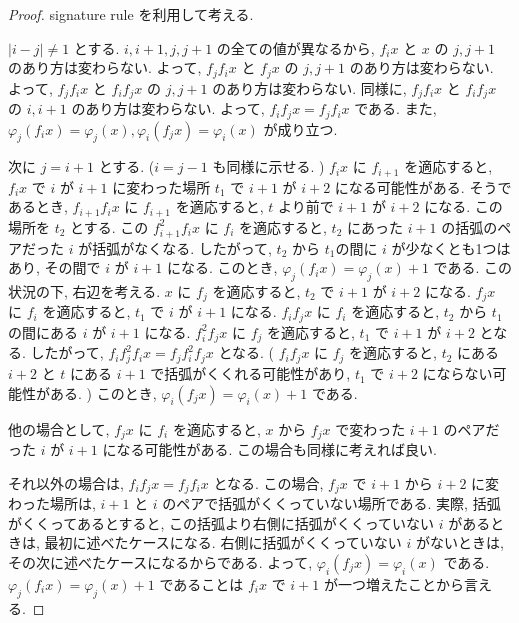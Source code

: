 \documentclass[
  a4paper, 
  12pt,
  ja=standard,
  xelatex,
  left=30truemm,
  right=30truemm,
  titlepage 
]{bxjsarticle}
\theoremstyle{definition}
\begin{document}
\begin{proof}
  signature rule を利用して考える.

  $| i - j | \neq 1$ とする.
  $i, i + 1, j, j + 1$ の全ての値が異なるから,
  $f_i x$ と $x$ の $j, j + 1$ のあり方は変わらない. よって,
  $f_jf_i x$ と $f_jx$ の $j, j + 1$ のあり方は変わらない. よって,
  $f_jf_i x$ と $f_if_jx$ の $j, j + 1$ のあり方は変わらない.
  同様に, $f_jf_i x$ と $f_if_jx$ の $i, i + 1$ のあり方は変わらない.
  よって, $f_if_j x = f_jf_i x$ である.
  また, $\varphi_j(f_ix) = \varphi_j(x), \varphi_i(f_jx) = \varphi_i(x)$
  が成り立つ.

  次に $j = i + 1$ とする. ($i = j - 1$ も同様に示せる. )
  $f_ix$ に $f_{i + 1}$ を適応すると, $f_ix$ で $i$ が $i + 1$ に変わった場所 $t_1$ で $i + 1$ が $i + 2$ になる可能性がある.
  そうであるとき, $f_{i + 1}f_ix$ に  $f_{i + 1}$ を適応すると, $t$ より前で $i + 1$ が $i + 2$ になる. この場所を
  $t_2$ とする. この $f_{i + 1}^2f_ix$ に $f_i$ を適応すると,
  $t_2$ にあった $i + 1$ の括弧のペアだった $i$ が括弧がなくなる. 
  したがって, $t_2$ から $t_1$の間に $i$ が少なくとも1つはあり, その間で $i$ が $i + 1$ になる.
  このとき, $\varphi_j(f_{i}x) = \varphi_j(x) + 1$ である.
  この状況の下, 右辺を考える.
  $x$ に $f_j$ を適応すると, $t_2$ で $i + 1$ が $i + 2$ になる.
  $f_jx$ に $f_i$ を適応すると, $t_1$ で $i$ が $i + 1$ になる.
  $f_if_jx$ に $f_i$ を適応すると, $t_2$ から $t_1$の間にある $i$ が $i + 1$ になる.
  $f_i^2f_jx$ に $f_j$ を適応すると, $t_1$ で $i + 1$ が $i + 2$ となる.
  したがって, $f_if_j^2f_i x = f_jf_i^2f_j x$ となる.
  ( $f_if_jx$ に $f_j$ を適応すると, $t_2$ にある $i + 2$ と $t$ にある $i +1$ で括弧がくくれる可能性があり,
  $t_1$ で $i + 2$ にならない可能性がある. )
  このとき, $\varphi_i(f_{j}x) = \varphi_i(x) + 1$ である.

  他の場合として, $f_jx$ に $f_i$ を適応すると, $x$ から $f_jx$ で変わった $i + 1$ のペアだった $i$ が $i + 1$
  になる可能性がある. この場合も同様に考えれば良い.

  それ以外の場合は, $f_if_j x = f_jf_i x$ となる.
  この場合, $f_{j}x$ で $i + 1$ から $i + 2$ に変わった場所は, $i + 1$ と $i$ のペアで括弧がくくっていない場所である.
  実際, 括弧がくくってあるとすると, この括弧より右側に括弧がくくっていない $i$ があるときは, 最初に述べたケースになる.
  右側に括弧がくくっていない $i$ がないときは, その次に述べたケースになるからである.
  よって, $\varphi_i(f_jx) = \varphi_i(x)$ である. $\varphi_j(f_ix) = \varphi_j(x) + 1$ であることは
  $f_ix$ で $i + 1$ が一つ増えたことから言える.
\end{proof}
\end{document}
